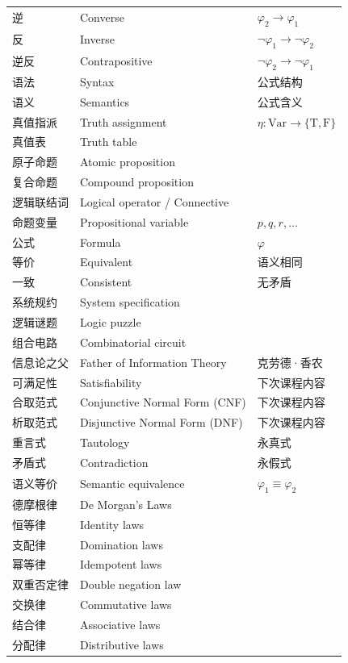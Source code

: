 \documentclass[UTF8,11pt,a4paper]{ctexbook}   %
\theoremstyle{definition}
\begin{document}
\begin{longtable}{|p{4.8cm}|p{4.8cm}|p{4.8cm}|}
逆 & Converse & $\varphi_2 \rightarrow \varphi_1$ \\
反 & Inverse & $\neg \varphi_1 \rightarrow \neg \varphi_2$ \\
逆反 & Contrapositive & $\neg \varphi_2 \rightarrow \neg \varphi_1$ \\
语法 & Syntax & 公式结构 \\
语义 & Semantics & 公式含义 \\
真值指派 & Truth assignment & $\eta: \text{Var} \to \{\text{T},\text{F}\}$ \\
真值表 & Truth table & \\
原子命题 & Atomic proposition & \\
复合命题 & Compound proposition & \\
逻辑联结词 & Logical operator / Connective & \\
命题变量 & Propositional variable & $p, q, r, \ldots$ \\
公式 & Formula & $\varphi$ \\
等价 & Equivalent & 语义相同 \\
一致 & Consistent & 无矛盾 \\
系统规约 & System specification & \\
逻辑谜题 & Logic puzzle & \\
组合电路 & Combinatorial circuit & \\
信息论之父 & Father of Information Theory & 克劳德·香农 \\
可满足性 & Satisfiability & 下次课程内容 \\
合取范式 & Conjunctive Normal Form (CNF) & 下次课程内容 \\
析取范式 & Disjunctive Normal Form (DNF) & 下次课程内容 \\ \hline
重言式 & Tautology & 永真式 \\
矛盾式 & Contradiction & 永假式 \\
语义等价 & Semantic equivalence & $\varphi_1 \equiv \varphi_2$ \\
德摩根律 & De Morgan's Laws & \\
恒等律 & Identity laws & \\
支配律 & Domination laws & \\
幂等律 & Idempotent laws & \\
双重否定律 & Double negation law & \\
交换律 & Commutative laws & \\
结合律 & Associative laws & \\
分配律 & Distributive laws & \\

\end{longtable}
\end{document}
